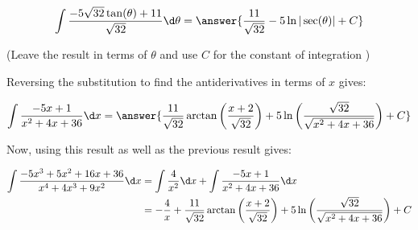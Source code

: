 \documentclass{ximera}
\begin{document}
\begin{exercise}
\begin{exercise}
\begin{exercise}
\begin{exercise}
\begin{exercise}
\begin{exercise}
\begin{exercise}
\begin{exercise}
\[
\int   \frac{-5\sqrt{32}\tan(\theta)+11}{\sqrt{32}}  \d \theta = \answer{\frac{11}{\sqrt{32}} -5\ln|\sec(\theta)|+C}
\]

(Leave the result in terms of $\theta$ and use $C$ for the constant of integration )

\begin{exercise}

Reversing the substitution to find the antiderivatives in terms of $x$ gives:

\[\int \frac{-5x+1}{x^{2}+4x+36} \d x =\answer{\frac{11}{\sqrt{32}}\arctan\left(\frac{x+2}{\sqrt{32}}\right)
+ 5\ln\left(\frac{\sqrt{32}}{\sqrt{x^{2}+4x+36}}\right) + C}
\]

\begin{exercise}

Now, using this result as well as the previous result gives:

\begin{align*}
\int \frac{-5x^{3}+5x^{2}+16x+36}{x^{4}+4x^{3}+9x^{2}} \d x &= \int \frac{4}{x^{2}} \d x + \int \frac{-5x+1}{x^{2}+4x+36} \d x \\
&=-\frac{4}{x}+\frac{11}{\sqrt{32}}\arctan\left(\frac{x+2}{\sqrt{32}}\right) + 5\ln\left(\frac{\sqrt{32}}{\sqrt{x^{2}+4x+36}}\right) + C
\end{align*}

 

\end{exercise}
\end{exercise}
\end{exercise}
\end{exercise}
\end{exercise} 
\end{exercise}
\end{exercise}
\end{exercise}
\end{exercise}
\end{exercise}
\end{document}

